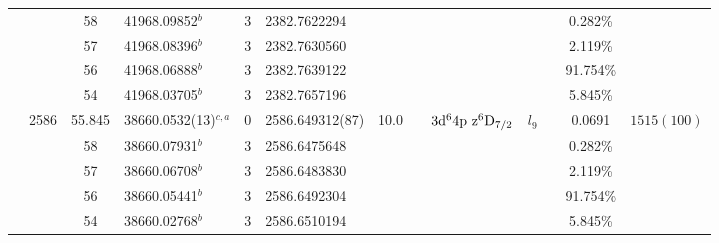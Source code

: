 \begin{table*}
\begin{center}
{\begin{tabular}{:l;l;c;l;c;l;c;l;l;c;c;c;c}
\rowstyle{\itshape}               &        & 58        & 41968.09852$^{b}$                & 3 &  2382.7622294      &      & $                                        $ & $                                        $ & $      $ &              & 0.282\%   & $          $\\
\rowstyle{\itshape}               &        & 57        & 41968.08396$^{b}$                & 3 &  2382.7630560      &      & $                                        $ & $                                        $ & $      $ &              & 2.119\%   & $          $\\
\rowstyle{\itshape}               &        & 56        & 41968.06888$^{b}$                & 3 &  2382.7639122      &      & $                                        $ & $                                        $ & $      $ &              & 91.754\%  & $          $\\
\rowstyle{\itshape}               &        & 54        & 41968.03705$^{b}$                & 3 &  2382.7657196      &      & $                                        $ & $                                        $ & $      $ &              & 5.845\%   & $          $\\
                                  & 2586   & 55.845    & 38660.0532(13)$^{c,a}$           & 0 &   2586.649312(87)  & 10.0 & $                                        $ & $3\rm{d}^64\rm{p~z}^6\rm{D}_{7/2}        $ & $l_{9} $ &              & 0.0691    & $ 1515(100)$\\
\rowstyle{\itshape}               &        & 58        & 38660.07931$^{b}$                & 3 &  2586.6475648      &      & $                                        $ & $                                        $ & $      $ &              & 0.282\%   & $          $\\
\rowstyle{\itshape}               &        & 57        & 38660.06708$^{b}$                & 3 &  2586.6483830      &      & $                                        $ & $                                        $ & $      $ &              & 2.119\%   & $          $\\
\rowstyle{\itshape}               &        & 56        & 38660.05441$^{b}$                & 3 &  2586.6492304      &      & $                                        $ & $                                        $ & $      $ &              & 91.754\%  & $          $\\
\rowstyle{\itshape}               &        & 54        & 38660.02768$^{b}$                & 3 &  2586.6510194      &      & $                                        $ & $                                        $ & $      $ &              & 5.845\%   & $          $\\

\end{tabular}}
\end{center}
\end{table*}
